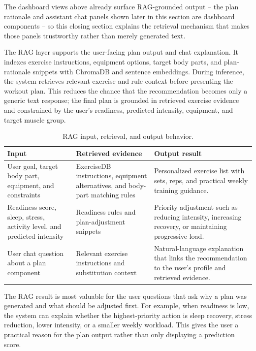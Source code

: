 \documentclass{aitthesis}
\begin{document}
The dashboard views above already surface RAG-grounded output -- the plan rationale and assistant chat panels shown later in this section are dashboard components -- so this closing section explains the retrieval mechanism that makes those panels trustworthy rather than merely generated text.

The RAG layer supports the user-facing plan output and chat explanation. It indexes exercise instructions, equipment options, target body parts, and plan-rationale snippets with ChromaDB and sentence embeddings. During inference, the system retrieves relevant exercise and rule context before presenting the workout plan. This reduces the chance that the recommendation becomes only a generic text response; the final plan is grounded in retrieved exercise evidence and constrained by the user's readiness, predicted intensity, equipment, and target muscle group.

\begin{table}[htbp]
\centering
\small
\caption{RAG input, retrieval, and output behavior.}
\label{tab:chapter4_rag_io}
\begin{tabularx}{\linewidth}{p{3.2cm}p{3.7cm}X}
\toprule
\textbf{Input} & \textbf{Retrieved evidence} & \textbf{Output result} \\
\midrule
User goal, target body part, equipment, and constraints & ExerciseDB instructions, equipment alternatives, and body-part matching rules & Personalized exercise list with sets, reps, and practical weekly training guidance. \\[10pt]
Readiness score, sleep, stress, activity level, and predicted intensity & Readiness rules and plan-adjustment snippets & Priority adjustment such as reducing intensity, increasing recovery, or maintaining progressive load. \\[10pt]
User chat question about a plan component & Relevant exercise instructions and substitution context & Natural-language explanation that links the recommendation to the user's profile and retrieved evidence. \\
\bottomrule
\end{tabularx}
\end{table}

The RAG result is most valuable for the user questions that ask why a plan was generated and what should be adjusted first. For example, when readiness is low, the system can explain whether the highest-priority action is sleep recovery, stress reduction, lower intensity, or a smaller weekly workload. This gives the user a practical reason for the plan output rather than only displaying a prediction score.
\end{document}
